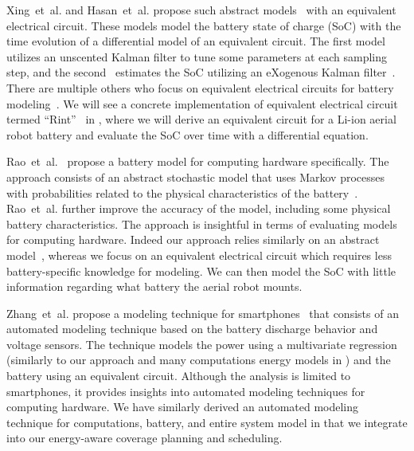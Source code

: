 Xing~et~al. and Hasan~et~al. propose such abstract models~\citep{xing2014state,hasan2018exogenous} with an equivalent electrical circuit. These models model the battery state of charge (SoC) with the time evolution of a differential model of an equivalent circuit. The first model~\citep{xing2014state} utilizes an unscented Kalman filter to tune some parameters at each sampling step, and the second~\citep{hasan2018exogenous} estimates the SoC utilizing an eXogenous Kalman filter~\citep{johansen2017exogenous}. 
There are multiple others who focus on equivalent electrical circuits for battery modeling~\citep{zhang2018online,zhang2012estimation,zhang2009battery,saeed2019electrical,mousavi2014various,hinz2019comparison,he2011evaluation}. We will see a concrete implementation of equivalent electrical circuit termed ``Rint''~\citep{mousavi2014various,hinz2019comparison,he2011evaluation} in , where we will derive an equivalent circuit for a Li-ion aerial robot battery and evaluate the SoC over time with a differential equation.

Rao~et~al.~\citep{rao2005battery} propose a battery model for computing hardware specifically. The approach consists of an abstract stochastic model that uses Markov processes with probabilities related to the physical characteristics of the battery~\citep{panigrahi2001battery}. Rao~et~al. further improve the accuracy of the model, including some physical battery characteristics. The approach is insightful in terms of evaluating models for computing hardware. Indeed our approach relies similarly on an abstract model~\citep{hasan2018exogenous}, whereas we focus on an equivalent electrical circuit which requires less battery-specific knowledge for modeling. We can then model the SoC with little information regarding what battery the aerial robot mounts.

Zhang~et~al. propose a modeling technique for smartphones~\citep{zhang2010accurate} that consists of an automated modeling technique based on the battery discharge behavior and voltage sensors. The technique models the power using a multivariate regression (similarly to our approach and many computations energy models in ) and the battery using an equivalent circuit. Although the analysis is limited to smartphones, it provides insights into automated modeling techniques for computing hardware. We have similarly derived an automated modeling technique for computations, battery, and entire system model in  that we integrate into our energy-aware coverage planning and scheduling.


